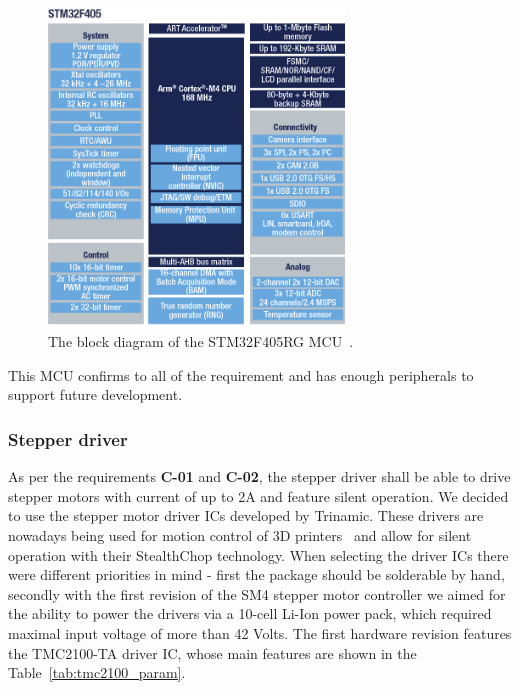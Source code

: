 \begin{figure}[H]
    \centering
    \includegraphics[width=0.7\textwidth]{obrazky/stm32f405_block_diagram}
    \caption{The block diagram of the STM32F405RG MCU~\cite{stm32f405}.}
    \label{fig:stm32f405_block_diagram}
\end{figure}

This MCU confirms to all of the requirement and has enough peripherals to support future development.

\subsubsection{Stepper driver}
\label{subsubsec:stepper_driver}
As per the requirements \textbf{C-01} and \textbf{C-02}, the stepper driver shall be able to drive stepper motors with current of up to 2A and feature silent operation.
We decided to use the stepper motor driver ICs developed by Trinamic.
These drivers are nowadays being used for motion control of 3D printers~\cite{prusa_trinamic} and allow for silent operation with their StealthChop technology.
When selecting the driver ICs there were different priorities in mind - first the package should be solderable by hand, secondly with the first revision of the SM4 stepper motor controller we aimed for the ability to power the drivers via a 10-cell Li-Ion power pack, which required maximal input voltage of more than 42 Volts.
The first hardware revision features the TMC2100-TA driver IC, whose main features are shown in the Table~\ref{tab:tmc2100_param}.

